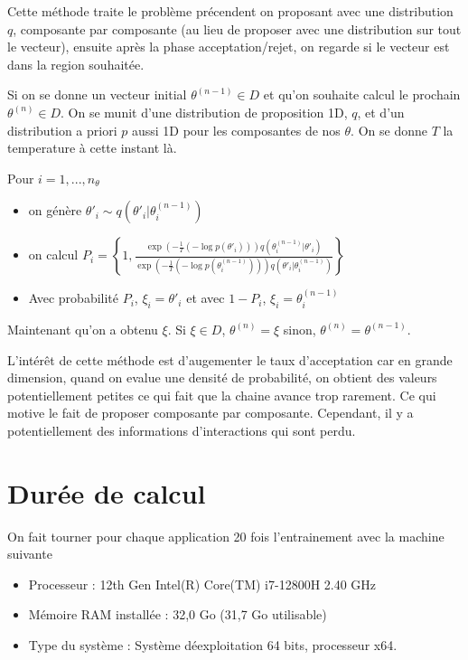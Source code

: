 \documentclass[french,12pt]{article}
\let\oldsection\section%
\renewcommand{\section}{%
  \renewcommand{\theequation}{\thesection.\arabic{equation}}%
  \oldsection}%
\begin{document}
Cette méthode traite le problème précendent on proposant avec une distribution $q$, composante par 
composante (au lieu de proposer avec une distribution sur tout le vecteur), 
ensuite après la phase acceptation/rejet, on regarde si le vecteur est dans la region souhaitée.

Si on se donne un vecteur initial $\theta^{(n-1)} \in D$ et qu'on souhaite calcul le prochain $\theta^{(n)} \in D$.
On se munit d'une distribution de proposition 1D, $q$, et d'un distribution a priori 
$p$ aussi 1D pour les composantes de nos $\theta$. On se donne $T$ la temperature à cette instant là.

Pour $i = 1, ..., n_{\theta}$

\begin{itemize}
    \item on génère  $\theta'_i \sim q( \theta'_i | \theta^{(n-1)}_i)$
    \item on calcul $P_i = \left\{1, \frac{\exp( - \frac{1}{T} ( - \log p(\theta'_i))) q( \theta^{(n-1)}_i| \theta'_i )}
    {\exp( - \frac{1}{T} (- \log p (\theta^{(n-1)}_i)))q( \theta'_i|\theta^{(n-1)}_i)}\right\}$ 
    \item Avec probabilité $P_i$, $\xi_i = \theta'_i$ et avec $1-P_i$, $\xi_i = \theta^{(n-1)}_i$
\end{itemize}

Maintenant qu'on a obtenu $\xi$. Si $\xi \in D$, $\theta^{(n)} = \xi$ sinon, $\theta^{(n)} = \theta^{(n-1)}$.

L'intérêt de cette méthode est d'augementer le taux d'acceptation car en grande dimension, quand on 
evalue une densité de probabilité, on obtient des valeurs potentiellement petites ce qui fait
que la chaine avance trop rarement. Ce qui motive le fait de proposer composante par composante.
Cependant, il y a potentiellement des informations d'interactions qui sont perdu.



\section*{Durée de calcul}

On fait tourner pour chaque application 20 fois l'entrainement avec la machine suivante

\begin{itemize}
    \item Processeur : 12th Gen Intel(R) Core(TM) i7-12800H   2.40 GHz
    \item Mémoire RAM installée : 32,0 Go (31,7 Go utilisable)
    \item Type du système : Système déexploitation 64 bits, processeur x64. 
\end{itemize}
\end{document}
